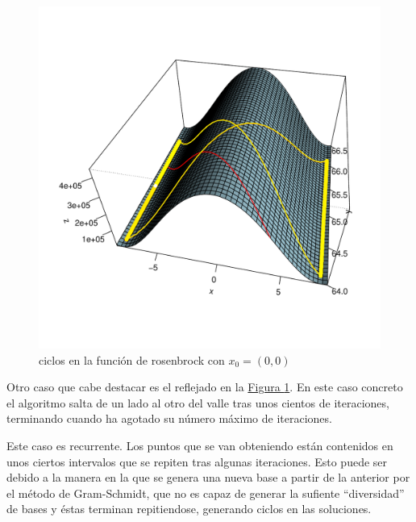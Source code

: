 \begin{figure}
\vspace{-4em}\hfill%
\hspace{-5ex}\includegraphics[width=1\linewidth]{../graphs/rosenbrock_fun/rosen/rosen_plot3.pdf}%
\hfill\hbox{}
\vspace{-4em}
\caption{\small ciclos en la función de rosenbrock con $x_0=(0,0)$} \label{fig:rosen2}
\vspace{-4.5em}
\end{figure}

Otro caso que cabe destacar es el reflejado en la \hyperref[fig:rosen2]{Figura \ref*{fig:rosen2}}. En este caso concreto el algoritmo salta de un lado al otro del valle tras unos cientos de iteraciones, terminando cuando ha agotado su número máximo de iteraciones.

Este caso es recurrente. Los puntos que se van obteniendo están contenidos en unos ciertos intervalos que se repiten tras algunas iteraciones. Esto puede ser debido a la manera en la que se genera una nueva base a partir de la anterior por el método de Gram-Schmidt, que no es capaz de generar la sufiente ``diversidad'' de bases y éstas terminan repitiendose, generando ciclos en las soluciones.
